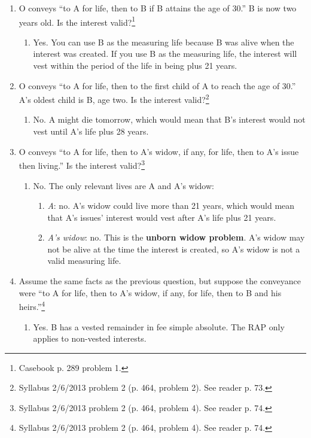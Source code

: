 \begin{enumerate}
    \item O conveys ``to A for life, then to B if B attains the age of 30.'' B 
    is now two years old. Is the interest valid?\footnote{Casebook p. 289 
    problem 1.}
    \begin{enumerate}
        \item Yes. You can use B as the measuring life because B was alive 
        when the interest was created. If you use B as the measuring life, the 
        interest will vest within the period of the life in being plus 21 
        years.
    \end{enumerate}
    \item O conveys ``to A for life, then to the first child of A to reach the 
    age of 30.'' A's oldest child is B, age two. Is the interest 
    valid?\footnote{Syllabus 2/6/2013 problem 2 (p. 464, problem 2). See 
    reader p. 73.}
    \begin{enumerate}
        \item No. A might die tomorrow, which would 
        mean that B's interest would not vest until A's life plus 28 
        years.
    \end{enumerate}
    \item O conveys ``to A for life, then to A's widow, if any, for life, then 
    to A's issue then living.'' Is the interest valid?\footnote{Syllabus 
    2/6/2013 problem 2 (p. 464, problem 4). See reader p. 74.}
    \begin{enumerate}
        \item No. The only relevant lives are A and A's widow:
        \begin{enumerate}
            \item \emph{A}: no. A's widow could live more than 21 years, which 
            would mean that A's issues' interest would vest after A's life 
            plus 21 years.
            \item \emph{A's widow}: no. This is the \textbf{unborn widow 
            problem}. A's widow may not be alive at the time the interest is 
            created, so A's widow is not a valid measuring life.
        \end{enumerate}
    \end{enumerate}
    \item Assume the same facts as the previous question, but suppose the 
    conveyance were ``to A for life, then to A's widow, if any, for life, then 
    to B and his heirs.''\footnote{Syllabus 2/6/2013 problem 2 (p. 464, 
    problem 4). See reader p. 74.}
    \begin{enumerate}
        \item Yes. B has a vested remainder in fee simple absolute. The RAP 
        only applies to non-vested interests.
    \end{enumerate}
\end{enumerate}

